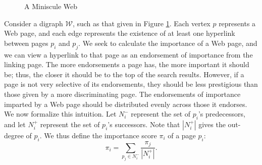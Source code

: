 \documentclass[../exploring-pagerank.tex]{subfiles}
\begin{document}
	\begin{figure}[h]
		\centering {}
		\caption{A Miniscule Web}
		\label{fig:web}
	\end{figure}
	Consider a digraph $\mathcal{W}$, such as that given in Figure \ref{fig:web}. Each vertex $p$ represents a Web page, and each edge represents the existence of at least one hyperlink between pages $p_i$ and $p_j$. We seek to calculate the importance of a Web page, and we can view a hyperlink to that page as an endorsement of importance from the linking page. The more endorsements a page has, the more important it should be; thus, the closer it should be to the top of the search results. However, if a page is not very selective of its endorsements, they should be less prestigious than those given by a more discriminating page. The endorsements of importance imparted by a Web page should be distributed evenly across those it endorses. We now formalize this intuition. Let $N^-_i$ represent the set of $p_i$'s predecessors, and let $N^+_i$ represent the set of $p_i$'s successors. Note that $|N^+_i|$ gives the out-degree of $p_i$. We thus define the importance score $\pi_i$ of a page $p_i$:
 	\begin{equation}\label{eqn:pi_i}
 		\pi_i = \sum_{p_j\in N^-_i}{\frac{\pi_j}{|N^+_i|}}.
 	\end{equation}
 	
\end{document}
